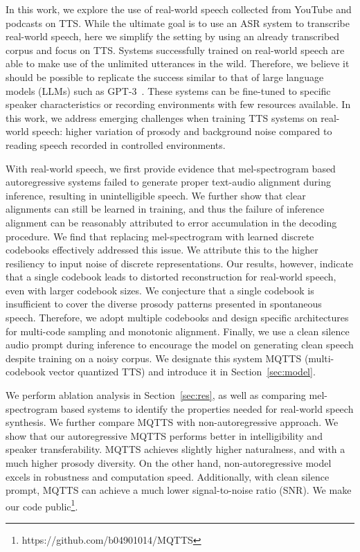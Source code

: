 \documentclass[letterpaper]{article}
\begin{document}
In this work, we explore the use of real-world speech collected from YouTube and podcasts on TTS.
While the ultimate goal is to use an ASR system to transcribe real-world speech, here we simplify the setting by using an already transcribed corpus and focus on TTS.
Systems successfully trained on real-world speech are able to make use of the unlimited utterances in the wild.
Therefore, we believe it should be possible to replicate the success similar to that of large language models (LLMs) such as GPT-3~\cite{NEURIPS2020_1457c0d6}.
These systems can be fine-tuned to specific speaker characteristics or recording environments with few resources available.
In this work, we address emerging challenges when training TTS systems on real-world speech: higher variation of prosody and background noise compared to reading speech recorded in controlled environments.

With real-world speech, we first provide evidence that mel-spectrogram based autoregressive systems failed to generate proper text-audio alignment during inference, resulting in unintelligible speech.
We further show that clear alignments can still be learned in training, and thus the failure of inference alignment can be reasonably attributed to error accumulation in the decoding procedure.
We find that replacing mel-spectrogram with learned discrete codebooks effectively addressed this issue.
We attribute this to the higher resiliency to input noise of discrete representations.
Our results, however, indicate that a single codebook leads to distorted reconstruction for real-world speech, even with larger codebook sizes.
We conjecture that a single codebook is insufficient to cover the diverse prosody patterns presented in spontaneous speech.
Therefore, we adopt multiple codebooks and design specific architectures for multi-code sampling and monotonic alignment.
Finally, we use a clean silence audio prompt during inference to encourage the model on generating clean speech despite training on a noisy corpus.
We designate this system MQTTS (multi-codebook vector quantized TTS) and introduce it in Section~\ref{sec:model}.

We perform ablation analysis in Section~\ref{sec:res}, as well as comparing mel-spectrogram based systems to identify the properties needed for real-world speech synthesis.
We further compare MQTTS with non-autoregressive approach.
We show that our autoregressive MQTTS performs better in intelligibility and speaker transferability.
MQTTS achieves slightly higher naturalness, and with a much higher prosody diversity.
On the other hand, non-autoregressive model excels in robustness and computation speed.
Additionally, with clean silence prompt, MQTTS can achieve a much lower signal-to-noise ratio (SNR).
We make our code public\footnote{https://github.com/b04901014/MQTTS}.%
\end{document}
